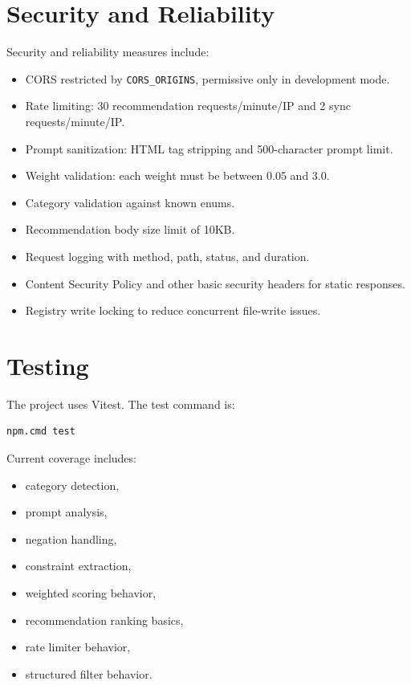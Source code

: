 \documentclass[11pt]{article}
\begin{document}
\section{Security and Reliability}

Security and reliability measures include:

\begin{itemize}[leftmargin=*]
  \item CORS restricted by \texttt{CORS\_ORIGINS}, permissive only in development mode.
  \item Rate limiting: 30 recommendation requests/minute/IP and 2 sync requests/minute/IP.
  \item Prompt sanitization: HTML tag stripping and 500-character prompt limit.
  \item Weight validation: each weight must be between 0.05 and 3.0.
  \item Category validation against known enums.
  \item Recommendation body size limit of 10KB.
  \item Request logging with method, path, status, and duration.
  \item Content Security Policy and other basic security headers for static responses.
  \item Registry write locking to reduce concurrent file-write issues.
\end{itemize}

\section{Testing}

The project uses Vitest. The test command is:

\begin{lstlisting}[style=code]
npm.cmd test
\end{lstlisting}

Current coverage includes:

\begin{itemize}[leftmargin=*]
  \item category detection,
  \item prompt analysis,
  \item negation handling,
  \item constraint extraction,
  \item weighted scoring behavior,
  \item recommendation ranking basics,
  \item rate limiter behavior,
  \item structured filter behavior.
\end{itemize}
\end{document}
